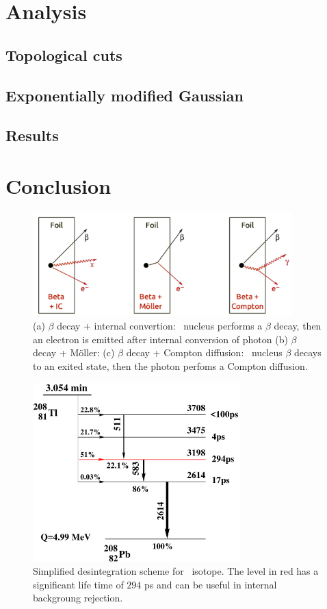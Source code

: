 \section{Analysis}
\subsection{Topological cuts}



\subsection{Exponentially modified Gaussian}
\subsection{Results}
\section{Conclusion}


\begin{figure}
  \centering
  \includegraphics[width=10cm]{timedifference/fig_timediff/internal_contamination.pdf}
  \caption{(a) $\beta$ decay + internal convertion: \Tl\ nucleus performs a $\beta$ decay, then an electron is emitted after internal conversion of photon
    (b) $\beta$ decay + Möller:
    (c) $\beta$ decay + Compton diffusion: \Tl\ nucleus $\beta$ decays to an exited state, then the photon perfoms a Compton diffusion.
 \label{fig:internal_contamination}}

\end{figure}

\begin{figure}
  \centering
  \includegraphics[width=8cm]{timedifference/fig_timediff/Desintegration_Tl.pdf}
  \caption{Simplified desintegration scheme for \Tl\ isotope.
    The level in red has a significant life time of $294$ ps and can be useful in internal backgroung rejection.
  \label{fig:Tl_scheme}}

\end{figure}

